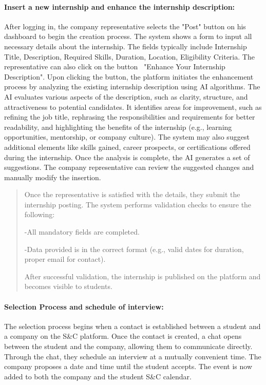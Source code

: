 \paragraph{Insert a new internship and enhance the internship
  description:} After logging in, the company representative selects the
  "Post" button on his dashboard to begin the creation process. The
  system shows a form to input all necessary details about the
  internship. The fields typically include Internship Title,
  Description, Required Skills, Duration, Location, Eligibility
  Criteria. The representative can also click on the button~ "Enhance
  Your Internship Description". Upon clicking the button, the platform
  initiates the enhancement process by analyzing the existing internship
  description using AI algorithms. The AI evaluates various aspects of
  the description, such as clarity, structure, and attractiveness to
  potential candidates. It identifies areas for improvement, such as
  refining the job title, rephrasing the responsibilities and
  requirements for better readability, and highlighting the benefits of
  the internship (e.g., learning opportunities, mentorship, or company
  culture). The system may also suggest additional elements like skills
  gained, career prospects, or certifications offered during the
  internship. Once the analysis is complete, the AI generates a set of
  suggestions. The company representative can review the suggested
  changes and manually modify the insertion.~

\begin{quote}
Once the representative is satisfied with the details, they submit the
internship posting. The system performs validation checks to ensure the
following:

-All mandatory fields are completed.

-Data provided is in the correct format (e.g., valid dates for duration,
proper email for contact).

After successful validation, the internship is published on the platform
and becomes visible to students.
\end{quote}

\paragraph{Selection Process and schedule of interview:} The selection
  process begins when a contact is established between a student and a
  company on the S\&C platform. Once the contact is created, a chat
  opens between the student and the company, allowing them to
  communicate directly. Through the chat, they schedule an interview at
  a mutually convenient time. The company proposes a date and time until
  the student accepts. The event is now added to both the company and
  the student S\&C calendar.

